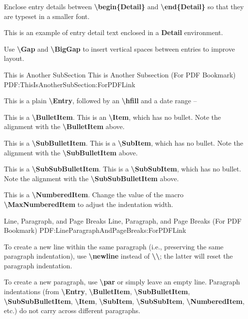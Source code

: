\documentclass[letterpaper,MMMyyyy,nonstopmode]{simpleresumecv}
\newcommand{\Code}[1]{\mbox{\textbf{#1}}}
\newcommand{\CodeCommand}[1]{\mbox{\textbf{\textbackslash{#1}}}}
\begin{document}
\begin{Body}
\Gap
\BulletItem
Enclose entry details between
\CodeCommand{begin\{Detail\}} and
\CodeCommand{end\{Detail\}}
so that they are typeset in a smaller font.
\begin{Detail}
\Item
This is an example of entry detail text enclosed in a \Code{Detail} environment.
\end{Detail}

\Gap
\BulletItem
Use \CodeCommand{Gap} and \CodeCommand{BigGap} to insert vertical spaces between entries to improve layout.

\BigGap
\SubSection
{This is Another SubSection}
{This is Another Subsection (For PDF Bookmark)}
{PDF:ThisIsAnotherSubSection:ForPDFLink}

\BigGap
\Entry
This is a plain \CodeCommand{Entry},
followed by an \CodeCommand{hfill} and a date range
\hfill
{} --

\Gap
\BulletItem
This is a \CodeCommand{BulletItem}.
\Item
This is an \CodeCommand{Item}, which has no bullet.
Note the alignment with the \CodeCommand{BulletItem} above.

\Gap
\SubBulletItem
This is a \CodeCommand{SubBulletItem}.
\SubItem
This is a \CodeCommand{SubItem}, which has no bullet.
Note the alignment with the \CodeCommand{SubBulletItem} above.

\Gap
\SubSubBulletItem
This is a \CodeCommand{SubSubBulletItem}.
\SubSubItem
This is a \CodeCommand{SubSubItem}, which has no bullet.
Note the alignment with the \CodeCommand{SubSubBulletItem} above.

\Gap
\NumberedItem{[42]}
This is a \CodeCommand{NumberedItem}.
Change the value of the macro \CodeCommand{MaxNumberedItem} to adjust the indentation width.

\BigGap
\SubSection
{Line, Paragraph, and Page Breaks}
{Line, Paragraph, and Page Breaks (For PDF Bookmark)}
{PDF:LineParagraphAndPageBreaks:ForPDFLink}

\BigGap
\BulletItem
To create a new line within the same paragraph (i.e., preserving the same paragraph indentation), use \CodeCommand{newline} instead of \CodeCommand{\textbackslash};
the latter will reset the paragraph indentation.

\Gap
\BulletItem
To create a new paragraph, use \CodeCommand{par} or simply leave an empty line.
Paragraph indentations (from
\CodeCommand{Entry},
\CodeCommand{BulletItem},
\CodeCommand{SubBulletItem},
\CodeCommand{SubSubBulletItem},
\CodeCommand{Item},
\CodeCommand{SubItem},
\CodeCommand{SubSubItem},
\CodeCommand{NumberedItem},
etc.) do not carry across different paragraphs.


\end{Body}
\end{document}
